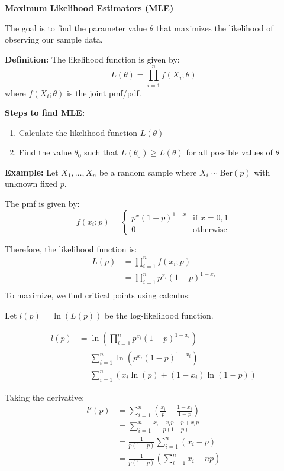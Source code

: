 \documentclass{article}
\begin{document}
   \textbf{Maximum Likelihood Estimators (MLE)}
   
   The goal is to find the parameter value $\theta$ that maximizes the likelihood of observing our sample data.
   
   \textbf{Definition:} The likelihood function is given by:
   \[L(\theta) = \prod_{i=1}^n f(X_i; \theta)\]
   where $f(X_i; \theta)$ is the joint pmf/pdf.
   
   \textbf{Steps to find MLE:}
   \begin{enumerate}
       \item Calculate the likelihood function $L(\theta)$
       \item Find the value $\theta_0$ such that $L(\theta_0) \geq L(\theta)$ for all possible values of $\theta$
   \end{enumerate}
   
   \textbf{Example:} Let $X_1, \ldots, X_n$ be a random sample where $X_i \sim \text{Ber}(p)$ with unknown fixed $p$.
   
   The pmf is given by:
   \[f(x_i; p) = \begin{cases}
       p^x(1-p)^{1-x} & \text{if } x = 0, 1 \\
       0 & \text{otherwise}
   \end{cases}\]
   
   Therefore, the likelihood function is:
   \begin{align*}
       L(p) &= \prod_{i=1}^n f(x_i; p) \\
       &= \prod_{i=1}^n p^{x_i}(1-p)^{1-x_i} \\
   \end{align*}
   To maximize, we find critical points using calculus:
   
   Let $l(p) = \ln(L(p))$ be the log-likelihood function.
   
   \begin{align*}
       l(p) &= \ln\left(\prod_{i=1}^{n}p^{x_i}(1-p)^{1-x_i}\right) \\
       &= \sum_{i=1}^{n} \ln(p^{x_i}(1-p)^{1-x_i}) \\
       &= \sum_{i=1}^{n} \left(x_i\ln(p) + (1-x_i)\ln(1-p)\right)
   \end{align*}
   
   Taking the derivative:
   \begin{align*}
       l'(p) &= \sum_{i=1}^{n} \left(\frac{x_i}{p} - \frac{1-x_i}{1-p}\right) \\
       &= \sum_{i=1}^{n} \frac{x_i-x_ip-p+x_ip}{p(1-p)} \\
       &= \frac{1}{p(1-p)} \sum_{i=1}^{n} (x_i-p) \\
       &= \frac{1}{p(1-p)} \left(\sum_{i=1}^{n} x_i - np\right)
   \end{align*}
   
\end{document}
